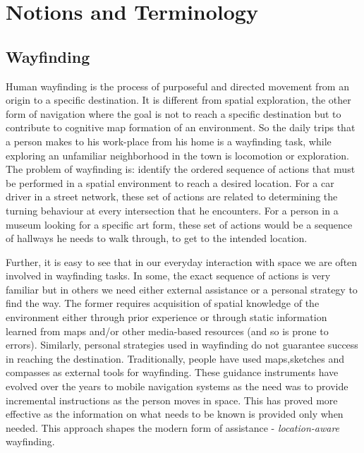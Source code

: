 \documentclass{iitkthesis}
\begin{document}
\section{Notions and Terminology}
\subsection{Wayfinding}
Human wayfinding is the process of purposeful and directed movement from 
an origin to a specific destination. It is different from spatial 
exploration, the other form of navigation where 
the goal is not to reach a specific destination but to contribute to 
cognitive map formation of an environment. So the daily trips that a 
person makes to his work-place from his home is a wayfinding task, while 
exploring an unfamiliar neighborhood in the town is locomotion or 
exploration. The problem of wayfinding is: identify the ordered 
sequence of actions that must be performed in a spatial environment to reach 
a desired location. For a car driver in a street network, these set of 
actions are related to determining the turning behaviour at every 
intersection that he encounters. For a person in a museum looking for a 
specific art form, these set of actions would be a sequence of hallways 
he needs to walk through, to get to the intended location. 

Further, it is easy to see that in our everyday interaction with space 
we are often involved in wayfinding tasks. In some, the exact sequence of 
actions is very familiar but in 
others we need either external assistance or a personal strategy to 
find the way. The former requires acquisition of spatial knowledge 
of the environment either through prior experience or through static 
information learned from maps and/or other media-based resources (and so 
is prone to errors). Similarly, personal strategies used in wayfinding do 
not guarantee success in reaching the destination. Traditionally, 
people have used maps,sketches and compasses as external tools for 
wayfinding. These guidance instruments have evolved over the years to 
mobile navigation systems as the need was to provide incremental 
instructions as the person moves in space. This has 
proved more effective as the information on what needs to be known 
is provided only when needed. This approach shapes the 
modern form of assistance - \textit{location-aware} wayfinding. 
\end{document}
